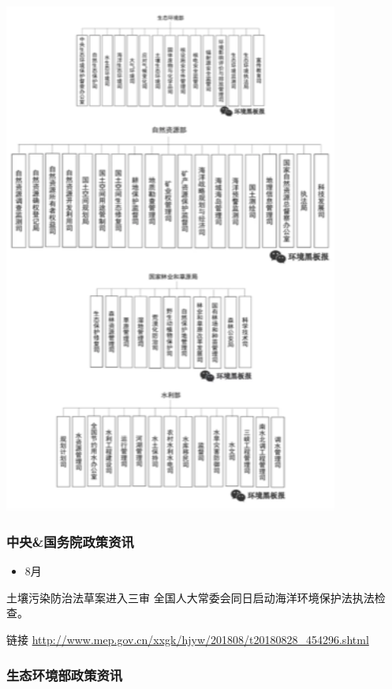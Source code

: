 \documentclass[]{book}
\providecommand{\tightlist}{%
  \setlength{\itemsep}{0pt}\setlength{\parskip}{0pt}}
\begin{document}
\includegraphics[width=4.33in]{images/zc2}

\hypertarget{ux4e2dux592eux56fdux52a1ux9662ux653fux7b56ux8d44ux8baf-4}{%
\subsubsection*{中央\&国务院政策资讯}\label{ux4e2dux592eux56fdux52a1ux9662ux653fux7b56ux8d44ux8baf-4}}

\begin{itemize}
\tightlist
\item
  8月
\end{itemize}

土壤污染防治法草案进入三审 全国人大常委会同日启动海洋环境保护法执法检查。

链接 \url{http://www.mep.gov.cn/xxgk/hjyw/201808/t20180828_454296.shtml}

\hypertarget{ux751fux6001ux73afux5883ux90e8ux653fux7b56ux8d44ux8baf-4}{%
\subsubsection*{生态环境部政策资讯}\label{ux751fux6001ux73afux5883ux90e8ux653fux7b56ux8d44ux8baf-4}}
\end{document}
